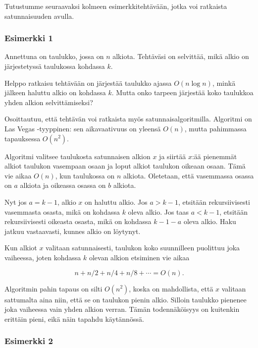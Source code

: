 Tutustumme seuraavaksi kolmeen esimerkkitehtävään,
jotka voi ratkaista satunnaisuuden avulla.

\subsubsection{Esimerkki 1}

\begin{task}
Annettuna on taulukko, jossa on $n$ alkiota.
Tehtäväsi on selvittää, mikä alkio on järjestetyssä
taulukossa kohdassa $k$.
\end{task}

Helppo ratkaisu tehtävään on järjestää
taulukko ajassa $O(n \log n)$, minkä jälkeen
haluttu alkio on kohdassa $k$.
Mutta onko tarpeen järjestää koko taulukkoa
yhden alkion selvittämiseksi?

Osoittautuu, että tehtävän voi ratkaista myös
satunnaisalgoritmilla.
Algoritmi on Las Vegas -tyyppinen:
sen aikavaativuus on yleensä $O(n)$,
mutta pahimmassa tapauksessa $O(n^2)$.

Algoritmi valitsee taulukosta satunnaisen alkion $x$
ja siirtää $x$:ää pienemmät alkiot
taulukon vasempaan osaan ja loput alkiot
taulukon oikeaan osaan.
Tämä vie aikaa $O(n)$, kun taulukossa on $n$ alkiota.
Oletetaan, että vasemmassa osassa on $a$
alkiota ja oikeassa osassa on $b$ alkiota.

Nyt jos $a=k-1$, alkio $x$ on haluttu alkio.
Jos $a>k-1$, etsitään rekursiivisesti
vasemmasta osasta, mikä on kohdassa $k$ oleva alkio.
Jos taas $a<k-1$, etsitään rekursiivisesti
oikeasta osasta, mikä on kohdassa $k-1-a$ oleva alkio.
Haku jatkuu vastaavasti, kunnes alkio on löytynyt.

Kun alkiot $x$ valitaan satunnaisesti,
taulukon koko suunnilleen puolittuu
joka vaiheessa, joten kohdassa $k$ olevan
alkion etsiminen vie aikaa

\[n+n/2+n/4+n/8+\cdots=O(n).\]

Algoritmin pahin tapaus on silti $O(n^2)$,
koska on mahdollista,
että $x$ valitaan sattumalta aina niin,
että se on taulukon pienin alkio.
Silloin taulukko pienenee joka vaiheessa
vain yhden alkion verran.
Tämän todennäköisyys on kuitenkin erittäin pieni,
eikä näin tapahdu käytännössä.

\subsubsection{Esimerkki 2}


